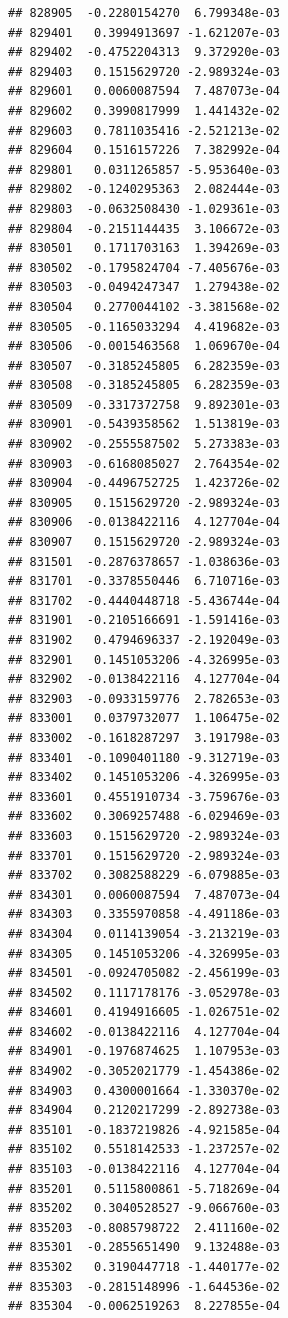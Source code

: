 \begin{frame}[fragile]
\begin{verbatim}
## 828905  -0.2280154270  6.799348e-03
## 829401   0.3994913697 -1.621207e-03
## 829402  -0.4752204313  9.372920e-03
## 829403   0.1515629720 -2.989324e-03
## 829601   0.0060087594  7.487073e-04
## 829602   0.3990817999  1.441432e-02
## 829603   0.7811035416 -2.521213e-02
## 829604   0.1516157226  7.382992e-04
## 829801   0.0311265857 -5.953640e-03
## 829802  -0.1240295363  2.082444e-03
## 829803  -0.0632508430 -1.029361e-03
## 829804  -0.2151144435  3.106672e-03
## 830501   0.1711703163  1.394269e-03
## 830502  -0.1795824704 -7.405676e-03
## 830503  -0.0494247347  1.279438e-02
## 830504   0.2770044102 -3.381568e-02
## 830505  -0.1165033294  4.419682e-03
## 830506  -0.0015463568  1.069670e-04
## 830507  -0.3185245805  6.282359e-03
## 830508  -0.3185245805  6.282359e-03
## 830509  -0.3317372758  9.892301e-03
## 830901  -0.5439358562  1.513819e-03
## 830902  -0.2555587502  5.273383e-03
## 830903  -0.6168085027  2.764354e-02
## 830904  -0.4496752725  1.423726e-02
## 830905   0.1515629720 -2.989324e-03
## 830906  -0.0138422116  4.127704e-04
## 830907   0.1515629720 -2.989324e-03
## 831501  -0.2876378657 -1.038636e-03
## 831701  -0.3378550446  6.710716e-03
## 831702  -0.4440448718 -5.436744e-04
## 831901  -0.2105166691 -1.591416e-03
## 831902   0.4794696337 -2.192049e-03
## 832901   0.1451053206 -4.326995e-03
## 832902  -0.0138422116  4.127704e-04
## 832903  -0.0933159776  2.782653e-03
## 833001   0.0379732077  1.106475e-02
## 833002  -0.1618287297  3.191798e-03
## 833401  -0.1090401180 -9.312719e-03
## 833402   0.1451053206 -4.326995e-03
## 833601   0.4551910734 -3.759676e-03
## 833602   0.3069257488 -6.029469e-03
## 833603   0.1515629720 -2.989324e-03
## 833701   0.1515629720 -2.989324e-03
## 833702   0.3082588229 -6.079885e-03
## 834301   0.0060087594  7.487073e-04
## 834303   0.3355970858 -4.491186e-03
## 834304   0.0114139054 -3.213219e-03
## 834305   0.1451053206 -4.326995e-03
## 834501  -0.0924705082 -2.456199e-03
## 834502   0.1117178176 -3.052978e-03
## 834601   0.4194916605 -1.026751e-02
## 834602  -0.0138422116  4.127704e-04
## 834901  -0.1976874625  1.107953e-03
## 834902  -0.3052021779 -1.454386e-02
## 834903   0.4300001664 -1.330370e-02
## 834904   0.2120217299 -2.892738e-03
## 835101  -0.1837219826 -4.921585e-04
## 835102   0.5518142533 -1.237257e-02
## 835103  -0.0138422116  4.127704e-04
## 835201   0.5115800861 -5.718269e-04
## 835202   0.3040528527 -9.066760e-03
## 835203  -0.8085798722  2.411160e-02
## 835301  -0.2855651490  9.132488e-03
## 835302   0.3190447718 -1.440177e-02
## 835303  -0.2815148996 -1.644536e-02
## 835304  -0.0062519263  8.227855e-04

\end{verbatim}
\end{frame}
